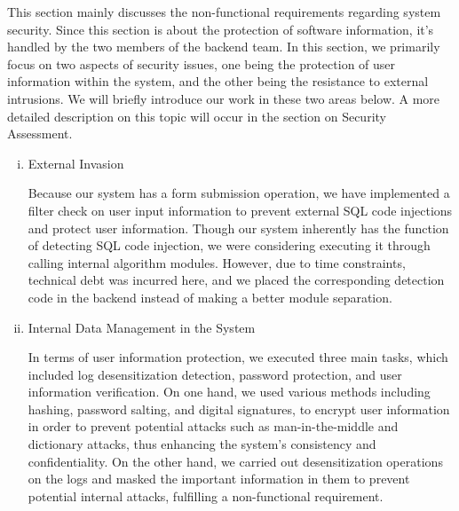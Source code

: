 This section mainly discusses the non-functional requirements regarding system security. Since this section is about the protection of software information, it's handled by the two members of the backend team. In this section, we primarily focus on two aspects of security issues, one being the protection of user information within the system, and the other being the resistance to external intrusions. We will briefly introduce our work in these two areas below. A more detailed description on this topic will occur in the section on Security Assessment.

\begin{enumerate}[(i)]
  \item External Invasion

Because our system has a form submission operation, we have implemented a filter check on user input information to prevent external SQL code injections and protect user information. Though our system inherently has the function of detecting SQL code injection, we were considering executing it through calling internal algorithm modules. However, due to time constraints, technical debt was incurred here, and we placed the corresponding detection code in the backend instead of making a better module separation.

  \item Internal Data Management in the System

In terms of user information protection, we executed three main tasks, which included log desensitization detection, password protection, and user information verification. On one hand, we used various methods including hashing, password salting, and digital signatures, to encrypt user information in order to prevent potential attacks such as man-in-the-middle and dictionary attacks, thus enhancing the system's consistency and confidentiality. On the other hand, we carried out desensitization operations on the logs and masked the important information in them to prevent potential internal attacks, fulfilling a non-functional requirement.
\end{enumerate}

